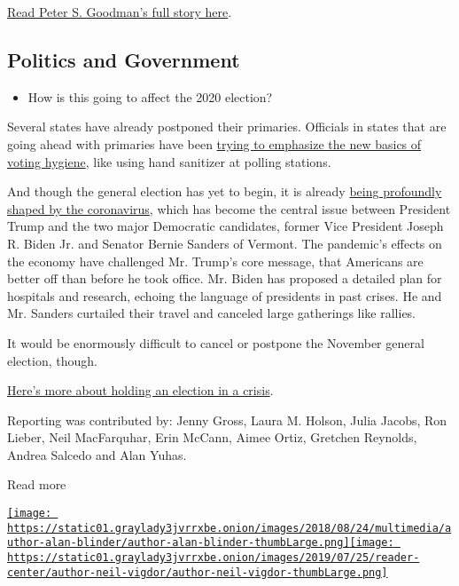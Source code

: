 \href{https://www.nytimes3xbfgragh.onion/2020/03/13/business/coronavirus-global-economy.html}{Read
Peter S. Goodman's full story here}.

\hypertarget{politics-and-government}{%
\subsection{Politics and Government}\label{politics-and-government}}

\begin{itemize}
\tightlist
\item
  How is this going to affect the 2020 election?
\end{itemize}

Several states have already postponed their primaries. Officials in
states that are going ahead with primaries have been
\href{https://www.nytimes3xbfgragh.onion/2020/03/09/us/virus-election-voting.html}{trying
to emphasize the new basics of voting hygiene}, like using hand
sanitizer at polling stations.

And though the general election has yet to begin, it is already
\href{https://www.nytimes3xbfgragh.onion/2020/03/12/us/politics/coronavirus-2020-campaign.html}{being
profoundly shaped by the coronavirus}, which has become the central
issue between President Trump and the two major Democratic candidates,
former Vice President Joseph R. Biden Jr. and Senator Bernie Sanders of
Vermont. The pandemic's effects on the economy have challenged Mr.
Trump's core message, that Americans are better off than before he took
office. Mr. Biden has proposed a detailed plan for hospitals and
research, echoing the language of presidents in past crises. He and Mr.
Sanders curtailed their travel and canceled large gatherings like
rallies.

It would be enormously difficult to cancel or postpone the November
general election, though.

\href{https://www.nytimes3xbfgragh.onion/2020/03/14/us/politics/election-postponed-canceled.html}{Here's
more about holding an election in a crisis}.

Reporting was contributed by: Jenny Gross, Laura M. Holson, Julia
Jacobs, Ron Lieber, Neil MacFarquhar, Erin McCann, Aimee Ortiz, Gretchen
Reynolds, Andrea Salcedo and Alan Yuhas.

Read more

\href{https://www.nytimes3xbfgragh.onion/by/alan-blinder}{\texttt{[image: https://static01.graylady3jvrrxbe.onion/images/2018/08/24/multimedia/author-alan-blinder/author-alan-blinder-thumbLarge.png]}}\href{https://www.nytimes3xbfgragh.onion/by/neil-vigdor}{\texttt{[image: https://static01.graylady3jvrrxbe.onion/images/2019/07/25/reader-center/author-neil-vigdor/author-neil-vigdor-thumbLarge.png]}}

